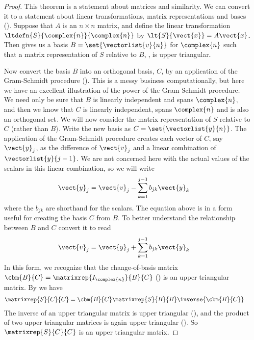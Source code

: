 %
\begin{proof}
This theorem is a statement about matrices and similarity.  We can convert it to a statement about linear transformations, matrix representations and bases ().  Suppose that $A$ is an $n\times n$ matrix, and define the linear transformation $\ltdefn{S}{\complex{n}}{\complex{n}}$ by $\lt{S}{\vect{x}}=A\vect{x}$.  Then  gives us a basis $B=\set{\vectorlist{v}{n}}$ for $\complex{n}$ such that a matrix representation of $S$ relative to $B$, , is upper triangular.\par
%
Now convert the basis $B$ into an orthogonal basis, $C$, by an application of the Gram-Schmidt procedure ().  This is a messy business computationally, but here we have an excellent illustration of the power of the Gram-Schmidt procedure.  We need only be sure that $B$ is linearly independent and spans $\complex{n}$, and then we know that $C$ is linearly independent, spans $\complex{n}$ and is also an orthogonal set.  We will now consider the matrix representation of $S$ relative to $C$ (rather than $B$).  Write the new basis as $C=\set{\vectorlist{y}{n}}$.  The application of the Gram-Schmidt procedure creates each vector of $C$, say $\vect{y}_j$, as the difference of $\vect{v}_j$ and a linear combination of $\vectorlist{y}{j-1}$.  We are not concerned here with the actual values of the scalars in this linear combination, so we will write
%
\begin{align*}
\vect{y}_j
&=\vect{v}_j-\sum_{k=1}^{j-1}b_{jk}\vect{y}_k
\end{align*}
%
where the $b_{jk}$ are shorthand for the scalars.  The equation above is in a form useful for creating the basis $C$ from $B$.  To better understand the relationship between $B$ and $C$ convert it to read
%
\begin{align*}
\vect{v}_j
&=\vect{y}_j+\sum_{k=1}^{j-1}b_{jk}\vect{y}_k
\end{align*}
%
In this form, we recognize that the change-of-basis matrix $\cbm{B}{C}=\matrixrep{I_{\complex{n}}}{B}{C}$ () is an upper triangular matrix.  By  we have
%
\begin{align*}
\matrixrep{S}{C}{C}&=\cbm{B}{C}\matrixrep{S}{B}{B}\inverse{\cbm{B}{C}}
\end{align*}
%
The inverse of an upper triangular matrix is upper triangular (), and the product of two upper triangular matrices is again upper triangular ().  So $\matrixrep{S}{C}{C}$ is an upper triangular matrix.\par

\end{proof}
